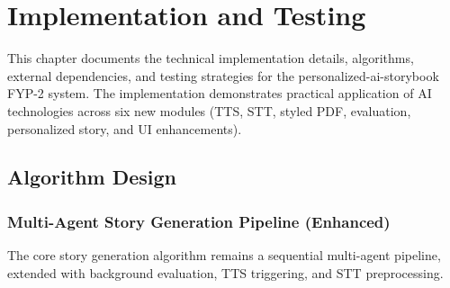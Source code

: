 \chapter{Implementation and Testing}
\label{sec:implementation}

This chapter documents the technical implementation details, algorithms, external dependencies, and testing strategies for the personalized-ai-storybook FYP-2 system. The implementation demonstrates practical application of AI technologies across six new modules (TTS, STT, styled PDF, evaluation, personalized story, and UI enhancements).

\section{Algorithm Design}

\subsection{Multi-Agent Story Generation Pipeline (Enhanced)}

The core story generation algorithm remains a sequential multi-agent pipeline, extended with background evaluation, TTS triggering, and STT preprocessing.


